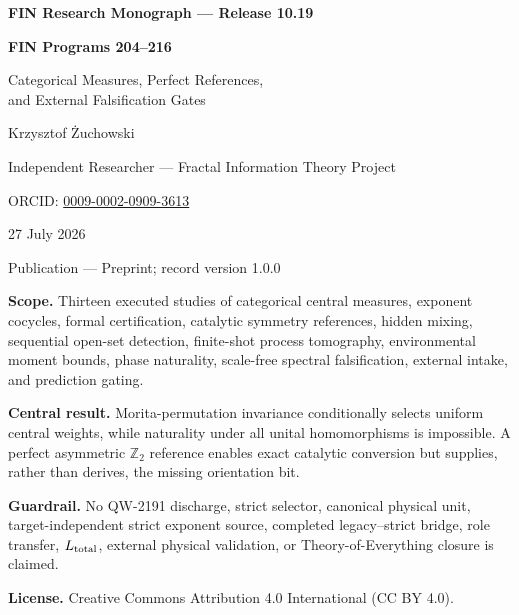\documentclass[11pt,a4paper,openany]{report}
\begin{document}
\hypersetup{pageanchor=false}
\begin{titlepage}
\centering
\vspace*{8mm}
{\Large\bfseries FIN Research Monograph --- Release 10.19\par}
\vspace{10mm}
{\Huge\bfseries FIN Programs 204--216\par}
\vspace{6mm}
{\Large Categorical Measures, Perfect References,\\
and External Falsification Gates\par}
\vspace{16mm}
{\Large Krzysztof \.Zuchowski\par}
\vspace{2mm}
{\normalsize Independent Researcher --- Fractal Information Theory Project\par}
\vspace{2mm}
{\normalsize ORCID: \href{https://orcid.org/0009-0002-0909-3613}{0009-0002-0909-3613}\par}
\vspace{10mm}
{\large 27 July 2026\par}
{\normalsize Publication --- Preprint; record version 1.0.0\par}
\vfill
\begin{minipage}{0.88\textwidth}
\small
\textbf{Scope.} Thirteen executed studies of categorical central measures,
exponent cocycles, formal certification, catalytic symmetry references,
hidden mixing, sequential open-set detection, finite-shot process
tomography, environmental moment bounds, phase naturality, scale-free
spectral falsification, external intake, and prediction gating.

\medskip
\textbf{Central result.} Morita-permutation invariance conditionally selects
uniform central weights, while naturality under all unital homomorphisms is
impossible. A perfect asymmetric \(\mathbb Z_2\) reference enables exact
catalytic conversion but supplies, rather than derives, the missing
orientation bit.

\medskip
\textbf{Guardrail.} No QW-2191 discharge, strict selector, canonical physical
unit, target-independent strict exponent source, completed legacy--strict
bridge, role transfer, \(L_{\rm total}\), external physical validation, or
Theory-of-Everything closure is claimed.

\medskip
\textbf{License.} Creative Commons Attribution 4.0 International (CC BY 4.0).
\end{minipage}
\vfill
\end{titlepage}
\hypersetup{pageanchor=true}
\end{document}

